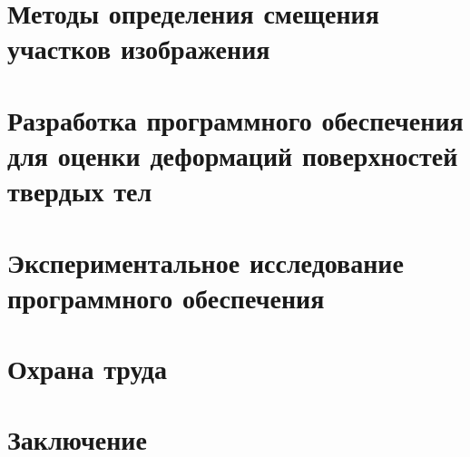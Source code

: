 




\newpage
{}
\renewcommand\contentsname{\hfill Содержание \hfill}
\tableofcontents

\section{Методы определения смещения участков изображения}

\section{Разработка программного обеспечения для оценки деформаций поверхностей твердых тел}

\newpage
\section{Экспериментальное исследование программного обеспечения}

\section{Охрана труда}

\section{Заключение}

\newpage
\renewcommand{\refname}{Список использованных источников}


